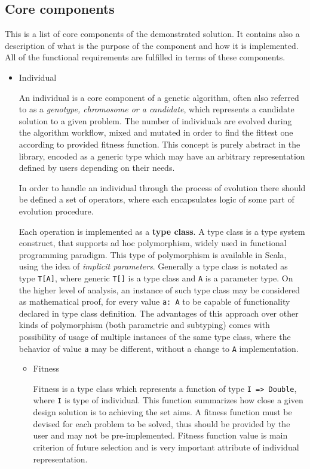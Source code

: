 \subsection{Core components}

This is a list of core components of the demonstrated solution. It contains also a description of what is the purpose of the component and how it is implemented. All of the functional requirements are fulfilled in terms of these components.

\begin{itemize}

\item
Individual

An individual is a core component of a genetic algorithm, often also referred to as a \textit{genotype, chromosome \emph{or} a candidate}, which represents a candidate solution to a given problem. The number of individuals are evolved during the algorithm workflow, mixed and mutated in order to find the fittest one according to provided fitness function. This concept is purely abstract in the library, encoded as a generic type which may have an arbitrary representation defined by users depending on their needs. 

In order to handle an individual through the process of evolution there should be defined a set of operators, where each encapsulates logic of some part of evolution procedure. 

Each operation is implemented as a \textbf{type class}. A type class is a type system construct, that supports ad hoc polymorphism, widely used in functional programming paradigm. This type of polymorphism is available in Scala, using the idea of \textit{implicit parameters}. Generally a type class is notated as type \texttt{T[A]}, where generic \texttt{T[]} is a type class and \texttt{A} is a parameter type. On the higher level of analysis, an instance of such type class may be considered as mathematical proof, for every value \texttt{a: A} to be capable of functionality declared in type class definition. The advantages of this approach over other kinds of polymorphism (both parametric and subtyping) comes with possibility of usage of multiple instances of the same type class, where the behavior of value \texttt{a} may be different, without a change to \texttt{A} implementation.
\medbreak

\begin{itemize}
\item
Fitness

Fitness is a type class which represents a function of type \texttt{I => Double}, where \texttt{I} is type of individual. This function summarizes how close a given design solution is to achieving the set aims. A fitness function must be devised for each problem to be solved, thus should be provided by the user and may not be pre-implemented. Fitness function value is main criterion of future selection and is very important attribute of individual representation.


\end{itemize}
\end{itemize}
